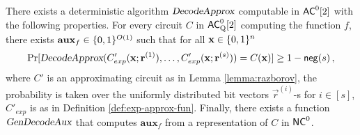 \def\auxf{\mathbf{aux}_f}


\begin{lemma}
\label{lemma:decode-approx}

There exists a deterministic algorithm ${\textsl{DecodeApprox}}$  computable in ${\mathsf{AC}}^0[2]$ with the following properties. 
For every circuit $C$ in ${\mathsf{AC}}^0_{\text{Q}}[2]$ computing the function $f$, there exists $\auxf \in \bit^{O(1)}$ such that for all $\mathbf{x} \in \{0, 1\}^n$
$$\Pr[{\textsl{DecodeApprox}}(C'_{exp}(\mathbf{x}; \mathbf{r}^{(1)}), \dots, C'_{exp}(\mathbf{x}; \mathbf{r}^{(s)}) ) = C(\mathbf{x})] \geq 1 - \mathsf{neg}(s) \, ,$$
where $C'$ is an approximating circuit as in Lemma \ref{lemma:razborov}, the probability is taken over  the uniformly distributed bit vectors $\vec{r}^{(i)}$-s for $i \in [s]$, $C'_{exp}$ is as in Definition \ref{def:exp-approx-fun}.
Finally, there exists a function ${\textsl{GenDecodeAux}}$ that computes $\auxf$ from a representation of $C$ in ${\mathsf{NC}}^0$.
\end{lemma}

